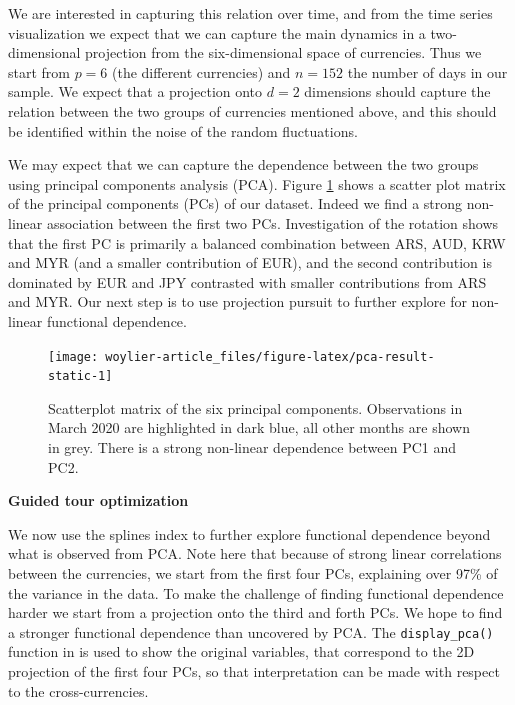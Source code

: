 We are interested in capturing this relation over time, and from the time series visualization we expect that we can capture the main dynamics in a two-dimensional projection from the six-dimensional space of currencies. Thus we start from \(p=6\) (the different currencies) and \(n=152\) the number of days in our sample. We expect that a projection onto \(d=2\) dimensions should capture the relation between the two groups of currencies mentioned above, and this should be identified within the noise of the random fluctuations.

We may expect that we can capture the dependence between the two groups using principal components analysis (PCA). Figure \ref{fig:pca-result-static} shows a scatter plot matrix of the principal components (PCs) of our dataset. Indeed we find a strong non-linear association between the first two PCs. Investigation of the rotation shows that the first PC is primarily a balanced combination between ARS, AUD, KRW and MYR (and a smaller contribution of EUR), and the second contribution is dominated by EUR and JPY contrasted with smaller contributions from ARS and MYR. Our next step is to use projection pursuit to further explore for non-linear functional dependence.

\begin{figure}

{\centering \texttt{[image: woylier-article\_files/figure-latex/pca-result-static-1]} 

}

\caption{Scatterplot matrix of the six principal components. Observations in March 2020 are highlighted in dark blue, all other months are shown in grey. There is a strong non-linear dependence between PC1 and PC2.}\label{fig:pca-result-static}
\end{figure}

\textbf{Guided tour optimization}

We now use the splines index to further explore functional dependence beyond what is observed from PCA. Note here that because of strong linear correlations between the currencies, we start from the first four PCs, explaining over 97\% of the variance in the data. To make the challenge of finding functional dependence harder we start from a projection onto the third and forth PCs. We hope to find a stronger functional dependence than uncovered by PCA. The \texttt{display\_pca()} function in  is used to show the original variables, that correspond to the 2D projection of the first four PCs, so that interpretation can be made with respect to the cross-currencies.

